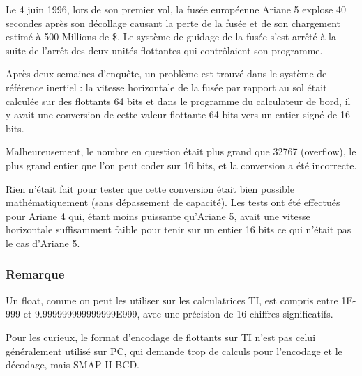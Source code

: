 \documentclass[10pt,fleqn]{article} %
\begin{document}
\begin{minipage}[c]{.69\linewidth}
Le 4 juin 1996, lors de son premier vol, la fusée européenne Ariane 5 explose 40 secondes après son décollage causant la perte de la fusée et de son chargement estimé à 500 Millions de \$. Le système de guidage de la fusée s’est arrêté à la suite de l’arrêt des deux unités flottantes qui contrôlaient son programme. 

Après deux semaines d’enquête, un problème est trouvé dans le système de référence inertiel : la vitesse horizontale de la fusée par rapport au sol était calculée sur des flottants 64 bits et dans le programme du calculateur de bord, il y avait une conversion de cette valeur flottante 64 bits vers un entier signé de 16 bits. 


Malheureusement, le nombre en question était plus grand que 32767 (overflow), le plus grand entier que l'on peut coder sur 16 bits, et la conversion a été incorrecte.


Rien n’était fait pour tester que cette conversion était bien possible mathématiquement (sans dépassement de capacité). Les tests ont été effectués pour Ariane 4 qui, étant moins puissante qu’Ariane 5, avait une vitesse horizontale suffisamment faible pour tenir sur un entier 16 bits ce 
qui n’était pas le cas d’Ariane 5.
\end{minipage}


\subsubsection*{Remarque}

Un float, comme on peut les utiliser sur les calculatrices TI, est compris entre 1E-999 et 9.999999999999999E999, avec une précision de 16 chiffres significatifs.

Pour les curieux, le format d'encodage de flottants sur TI n'est pas celui généralement utilisé sur PC, qui demande trop de calculs pour l'encodage et le décodage, mais SMAP II BCD.





\begin{thebibliography}{2}
\end{thebibliography}
\end{document}
